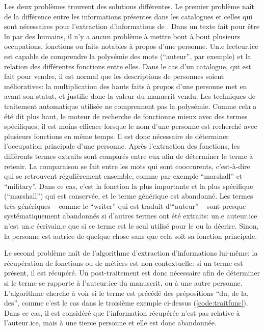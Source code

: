 Les deux problèmes trouvent des solutions différentes. Le premier problème naît de la différence entre les informations présentes dans les catalogues et celles qui sont nécessaires pour l'extraction d'informations de \wkd{}. Dans un texte fait pour être lu par des humains, il n'y a aucun problème à mettre bout à bout plusieurs occupations, fonctions ou faits notables à propos d'une personne. Un.e lecteur.ice est capable de comprendre la polysémie des mots (\enquote{auteur}, par exemple) et la relation des différentes fonctions entre elles. Dans le cas d'un catalogue, qui est fait pour vendre, il est normal que les descriptions de personnes soient mélioratives: la multiplication des hauts faits à propos d'une personne met en avant son statut, et justifie donc la valeur du manucrit vendu. Les techniques de traitement automatique utilisée ne comprennent pas la polysémie. Comme cela a été dit plus haut, le moteur de recherche de \wkd{} fonctionne mieux avec des termes spécifiques; il est moins efficace lorsque le nom d'une personne est recherché avec plusieurs fonctions en même temps. Il est donc nécessaire de déterminer l'occupation principale d'une personne. Après l'extraction des fonctions, les différents termes extraits sont comparés entre eux afin de déterminer le terme à retenir. La comparaison se fait entre les mots qui sont cooccurents, c'est-à-dire qui se retrouvent régulièrement ensemble, comme par exemple \enquote{marshall} et \enquote{military}. Dans ce cas, c'est la fonction la plus importante et la plus spécifique (\enquote{marshall}) qui est conservée, et le terme générique est abandonné. Les termes très génériques -- comme le \enquote{writer} qui est traduit d'\enquote{auteur} -- sont presque systématiquement abandonnés si d'autres termes ont été extraits: un.e auteur.ice n'est un.e écrivain.e que si ce terme est le seul utilisé pour le ou la décrire. Sinon, la personne est autrice de quelque chose sans que cela soit sa fonction principale.

Le second problème naît de l'algorithme d'extraction d'informations lui-même: la récupération de fonctions ou de métiers est non-contextuelle: si un terme est présent, il est récupéré. Un post-traitement est donc nécessaire afin de déterminer si le terme se rapporte à l'auteur.ice du manuscrit, ou à une autre personne. L'algorithme cherche à voir si le terme est précédé des prépositions \enquote{du, de la, des}, comme c'est le cas dans le troisième exemple ci-dessus (\ref{code:traitfunc}). Dans ce cas, il est considéré que l'information récupérée n'est pas relative à l'auteur.ice, mais à une tierce personne et elle est donc abandonnée.

